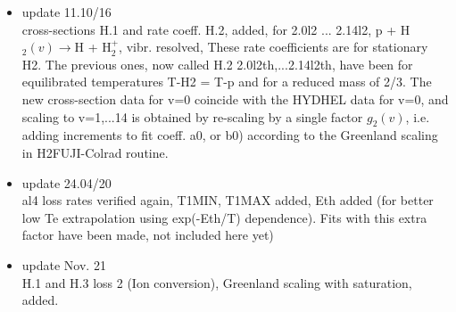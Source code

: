 \documentclass[12pt,dvipdfmx]{article}
\begin{document}
\begin{itemize}
\item update  11.10/16 \\
cross-sections H.1 and
rate coeff. H.2, added, for 2.0l2 ... 2.14l2, p + H$_2(v) \rightarrow $H + H$_2^+$, vibr. resolved,
These rate coefficients are for stationary H2. The previous ones,
now called H.2 2.0l2th,...2.14l2th, have been
for equilibrated temperatures T-H2 = T-p and for a reduced mass of 2/3.
The new cross-section data for v=0 coincide with the HYDHEL data for v=0,
and scaling to v=1,...14 is obtained by re-scaling by a single factor $g_2(v)$, i.e.
adding increments to fit coeff. a0, or b0)
according to the Greenland scaling in H2FUJI-Colrad routine.
\item update  24.04/20 \\
al4 loss rates verified again, T1MIN, T1MAX added, Eth added  (for better low Te extrapolation
using exp(-Eth/T) dependence). Fits with this extra factor have been made,
not included here yet)
\item update Nov. 21\\
H.1 and H.3 loss 2 (Ion conversion), Greenland scaling with saturation, added.
\end{itemize}
\end{document}
